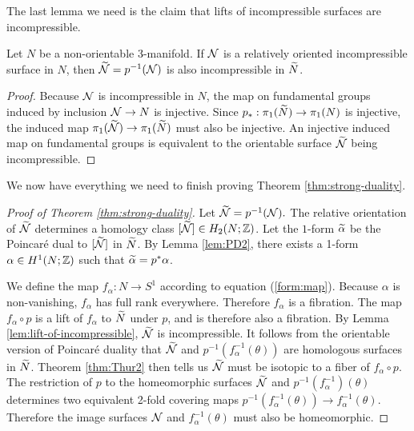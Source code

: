 The last lemma we need is the claim that lifts of incompressible surfaces are incompressible.
\begin{lem}
  \label{lem:lift-of-incompressible}
  Let $N$ be a non-orientable 3-manifold.  If $\mathcal{N}$ is a relatively oriented incompressible surface in $N$, then $\widetilde{\mathcal{N}}=p^{-1}(\mathcal{N})$ is also incompressible in $\widetilde{N}$.
\end{lem}
\begin{proof}
  Because $\mathcal{N}$ is incompressible in $N$, the map on fundamental groups induced by inclusion $\mathcal{N}\rightarrow N$ is injective.
Since $p_\ast:\pi_1(\widetilde{N})\rightarrow\pi_1(N)$ is injective, the induced map $\pi_1(\widetilde{\mathcal{N}}) \to \pi_1(\widetilde{N})$ must also be injective.  An injective induced map on fundamental groups is equivalent to the orientable surface $\widetilde{\mathcal{N}}$ being incompressible.
\end{proof}


We now have everything we need to finish proving Theorem \ref{thm:strong-duality}.
\begin{proof}[Proof of Theorem \ref{thm:strong-duality}]
  Let $\widetilde{\mathcal{N}}=p^{-1}(\mathcal{N}).$
  The relative orientation of $\widetilde{\mathcal{N}}$ determines a homology class $[\widetilde{\mathcal{N}}]\in H_2(N;\mathbb{Z})$.  Let the $1$-form $\widetilde{\alpha}$ be the Poincar\'e dual to $[\widetilde{\mathcal{N}}]$ in $\widetilde{N}$.
  By Lemma \ref{lem:PD2}, there exists a 1-form $\alpha\in H^1(N;\mathbb{Z})$ such that $\widetilde{\alpha}=p^\ast\alpha$.  %

We define the map $f_\alpha:N\rightarrow S^1$ according to equation (\ref{form:map}).  Because $\alpha$ is non-vanishing, $f_{\alpha}$ has full rank everywhere.  Therefore $f_\alpha$ is a fibration.
The map $f_{\alpha} \circ p$ is a lift of $f_{\alpha}$ to $\widetilde{N}$ under $p$, and is therefore also a fibration.
  By Lemma \ref{lem:lift-of-incompressible}, $\widetilde{\mathcal{N}}$ is incompressible.
It follows from the orientable version of Poincar\'e duality that $\widetilde{\mathcal{N}}$ and $p^{-1}(f_{\alpha}^{-1}(\theta))$ are homologous surfaces in $\widetilde{N}$.    Theorem \ref{thm:Thur2} then tells us $\widetilde{\mathcal{N}}$ must be isotopic to a fiber of $f_{\alpha} \circ p$.
  The restriction of $p$ to the homeomorphic surfaces $\widetilde{\mathcal{N}}$ and $p^{-1}(f_{\alpha}^{-1})(\theta)$ determines two equivalent 2-fold covering maps  $p^{-1}(f^{-1}_{\alpha}(\theta))\rightarrow f^{-1}_\alpha(\theta)$.  Therefore the image surfaces $\mathcal{N}$ and $f_{\alpha}^{-1}(\theta)$ must also be homeomorphic.
\end{proof}

